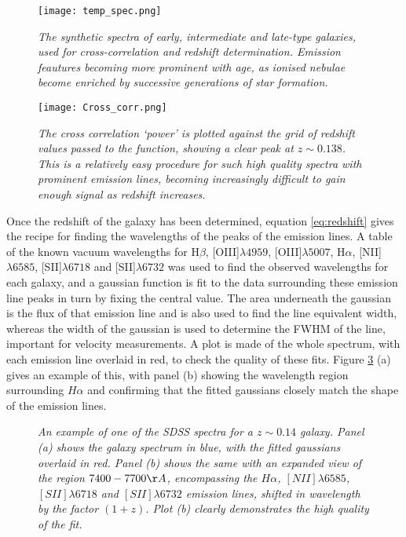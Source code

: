 \documentclass{literature}
\begin{document}
\begin{figure}[!htp]
\centering
\texttt{[image: temp\_spec.png]}
\caption{\footnotesize{\emph{The synthetic spectra of early, intermediate and late-type galaxies, used for cross-correlation and redshift determination. Emission feautures becoming more prominent with age, as ionised nebulae become enriched by successive generations of star formation.}}}
\label{fig:temp_spec}
\end{figure} 

\begin{figure}[!htp]
\centering
\texttt{[image: Cross\_corr.png]}
\caption{\footnotesize{\emph{The cross correlation `power' is plotted against the grid of redshift values passed to the function, showing a clear peak at $z\sim 0.138$. This is a relatively easy procedure for such high quality spectra with prominent emission lines, becoming increasingly difficult to gain enough signal as redshift increases. }}}
\label{fig:cross_cor}
\end{figure} 

Once the redshift of the galaxy has been determined, equation \ref{eq:redshift} gives the recipe for finding the wavelengths of the peaks of the emission lines. A table of the known vacuum wavelengths for H$\beta$, [OIII]$\lambda 4959$, [OIII]$\lambda 5007$, H$\alpha$, [NII]$\lambda 6585$, [SII]$\lambda 6718$ and [SII]$\lambda 6732$ was used to find the observed wavelengths for each galaxy, and a gaussian function is fit to the data surrounding these emission line peaks in turn by fixing the central value. The area underneath the gaussian is the flux of that emission line and is also used to find the line equivalent width, whereas the width of the gaussian is used to determine the FWHM of the line, important for velocity measurements. A plot is made of the whole spectrum, with each emission line overlaid in red, to check the quality of these fits. Figure \ref{fig:fitted_spec} (a) gives an example of this, with panel (b) showing the wavelength region surrounding $H\alpha$ and confirming that the fitted gaussians closely match the shape of the emission lines.\\    

\begin{figure}[!htp]
\centering
{}
\caption{\footnotesize{\emph{An example of one of the SDSS spectra for a $z\sim 0.14$ galaxy. Panel (a) shows the galaxy spectrum in blue, with the fitted gaussians overlaid in red. Panel (b) shows the same with an expanded view of the region $7400-7700\AA$, encompassing the $H\alpha$, $[NII]\lambda 6585$, $[SII]\lambda 6718$ and $[SII]\lambda 6732$ emission lines, shifted in wavelength by the factor $(1 + z)$. Plot (b) clearly demonstrates the high quality of the fit.}}}
\label{fig:fitted_spec}
\end{figure}
\end{document}
